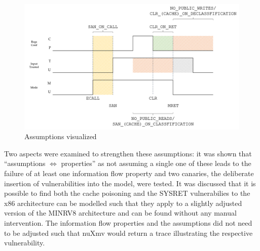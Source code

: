 \begin{figure}
    \centering
    \includegraphics[width=\textwidth]{figures/assumptions.png}
    \caption{Assumptions visualized}
    \label{fig:ifc-assumptions}
\end{figure}

Two aspects were examined to strengthen these assumptions: it was shown that \enquote{assumptions $ \Leftrightarrow $ properties} as not assuming a single one of these leads to the failure of at least one information flow property and two canaries, the deliberate insertion of vulnerabilities into the model, were tested.
It was discussed that it is possible to find both the cache poisoning \cite{Wojtczuk09} and the SYSRET vulnerabilies \cite{SYSRET-vuln,Dunlap19} to the x86 architecture can be modelled such that they apply to a slightly adjusted version of the MINRV8 architecture and can be found without any manual intervention.
The information flow properties and the assumptions did not need to be adjusted such that nuXmv would return a trace illustrating the respective vulnerability.
